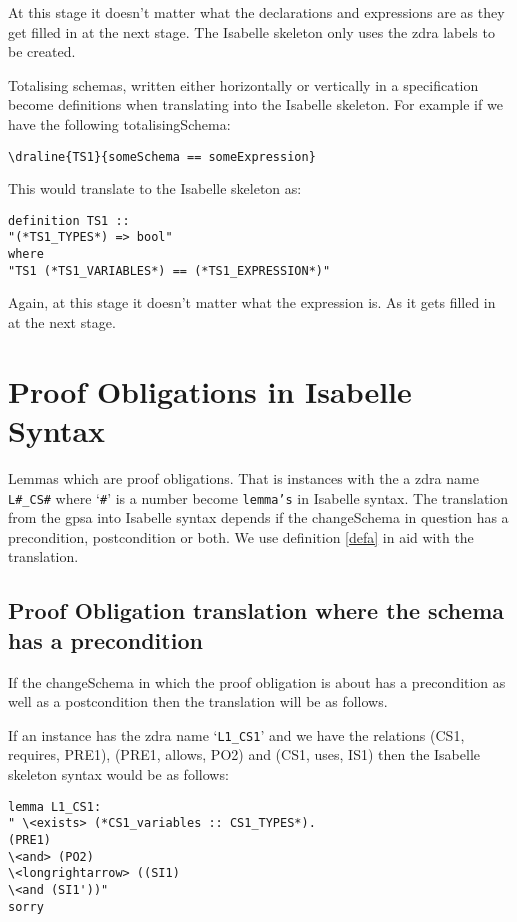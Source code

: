 At this stage it doesn't matter what the declarations and expressions are as
they get filled in at the next stage. The Isabelle skeleton only uses the
\gls{zdra} labels to be created.

Totalising schemas, written either horizontally or vertically in a specification
become definitions when translating into the Isabelle skeleton. For example if
we have the following totalisingSchema:

\verb|\draline{TS1}{someSchema == someExpression}|

This would translate to the Isabelle skeleton as:

\begin{verbatim}
definition TS1 ::
"(*TS1_TYPES*) => bool"
where
"TS1 (*TS1_VARIABLES*) == (*TS1_EXPRESSION*)"
\end{verbatim}

Again, at this stage it doesn't matter what the expression is. As it gets filled
in at the next stage.

\section{Proof Obligations in Isabelle Syntax}

Lemmas which are proof obligations. That is instances with the a \gls{zdra} name
\texttt{L\#\_CS\#} where `\texttt{\#}' is a number become \texttt{lemma's} in
Isabelle syntax. The translation from the \gls{gpsa} into Isabelle syntax
depends if the changeSchema in question has a precondition, postcondition or
both. We use definition \ref{defa} in aid with the translation.

\subsection{Proof Obligation translation where the schema has a precondition}

If the changeSchema in which the proof obligation is about has a precondition as
well as a postcondition then the translation will be as follows. 

If an instance has the \gls{zdra} name `\texttt{L1\_CS1}' and we have the
relations (CS1, requires, PRE1), (PRE1, allows, PO2) and (CS1, uses, IS1) then
the Isabelle skeleton syntax would be as follows:

\begin{verbatim}
lemma L1_CS1:
" \<exists> (*CS1_variables :: CS1_TYPES*).
(PRE1)
\<and> (PO2)
\<longrightarrow> ((SI1)
\<and (SI1'))"
sorry
\end{verbatim}

